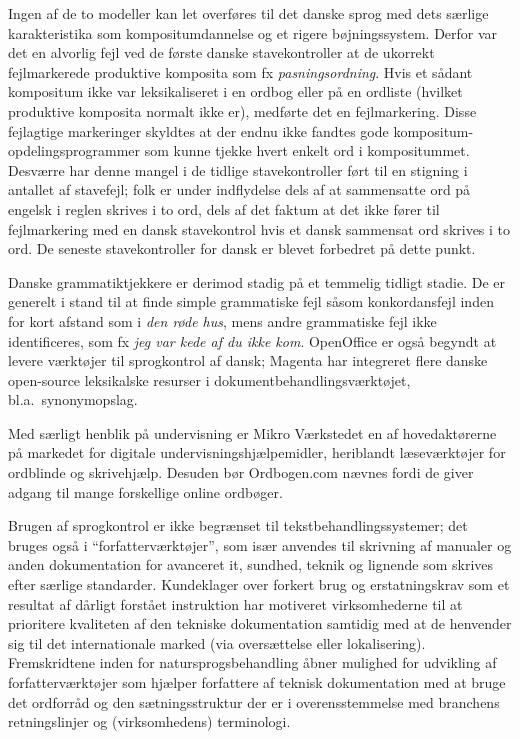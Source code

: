 \begin{multicols}{2}
Ingen af de to modeller kan let overf\o res til det danske sprog med dets s\ae rlige karakteristika som kompositumdannelse og et rigere b\o jningssystem. Derfor var det en alvorlig fejl ved de f\o rste danske stavekontroller at de ukorrekt fejlmarkerede produktive komposita som fx {\it pasningsordning}. Hvis et s\aa dant kompositum ikke var leksikaliseret i en ordbog eller \mbox{p\aa} en ordliste (hvilket produktive komposita normalt ikke er), medf\o rte det en fejlmarkering. Disse fejlagtige markeringer skyldtes at der endnu ikke fandtes gode kompositum-opdelingsprogrammer som kunne tjekke hvert enkelt ord i kompositummet. Desv\ae rre har denne mangel i de tidlige stavekontroller f\o rt til en stigning i antallet af stavefejl; folk er under indflydelse dels af at sammensatte ord \mbox{p\aa} engelsk i reglen skrives i to ord, dels af det faktum at det ikke f\o rer til fejlmarkering med en dansk stavekontrol hvis et dansk sammensat ord skrives i to ord.  De seneste stavekontroller for dansk er blevet forbedret \mbox{p\aa} dette punkt.

Danske grammatiktjekkere er derimod stadig \mbox{p\aa} et temmelig tidligt stadie. De er generelt i stand til at finde simple grammatiske fejl s\aa som konkordansfejl inden for kort afstand som i {\it *den r\o de hus}, mens andre grammatiske fejl ikke identificeres, som fx {\it *jeg var kede af du ikke kom}.
%
OpenOffice er \mbox{ogs\aa} begyndt at levere v\ae rkt\o jer til sprogkontrol af dansk; Magenta  har integreret flere danske open-source leksikalske resurser i dokumentbehandlingsv\ae rkt\o jet, bl.a.\ synonymopslag.

Med s\ae rligt henblik \mbox{p\aa} undervisning er Mikro V\ae rkstedet en af hovedakt\o rerne \mbox{p\aa} markedet for digitale undervisningshj\ae lpemidler, heriblandt l\ae sev\ae rkt\o jer for ordblinde og skrivehj\ae lp. Desuden b\o r Ordbogen.com n\ae vnes fordi de giver adgang til mange forskellige online ordb\o ger. 


Brugen af sprogkontrol er ikke begr\ae nset til tekstbehandlingssystemer; det bruges \mbox{ogs\aa} i ``forfatterv\ae rkt\o jer'', som is\ae r anvendes til skrivning af manualer og anden dokumentation for avanceret it, sundhed, teknik og lignende som skrives efter s\ae rlige standarder. Kundeklager over forkert brug og erstatningskrav som et resultat af d\aa rligt forst\aa et instruktion har motiveret virksomhederne til at prioritere kvaliteten af den tekniske dokumentation samtidig med at de henvender sig til det internationale marked (via overs\ae ttelse eller lokalise\-ring). Fremskridtene inden for natursprogsbehandling \aa bner mulighed for udvikling af forfatterv\ae rkt\o jer som hj\ae lper forfattere af teknisk dokumentation med at bruge det ordforr\aa d og den s\ae tningsstruktur der er i overensstemmelse med branchens retningslinjer og (virksomhedens) terminologi.


\end{multicols}
